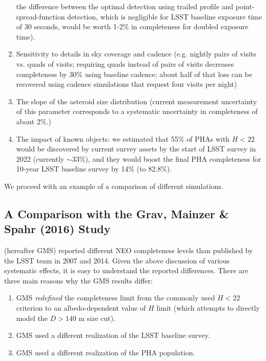 \begin{enumerate}
          the difference between the optimal detection using trailed profile and point-spread-function
          detection, which is negligible for LSST baseline exposure time of 30 seconds, would be worth 1-2\%
          in completeness for doubled exposure time).
\item Sensitivity to details in sky coverage and cadence (e.g. nightly pairs of visits vs. quads of visits;
          requiring quads instead of pairs of visits decreases completeness by 30\% using baseline cadence;
          about half of that loss can be recovered using cadence simulations that request four visits per night)
\item The slope of the asteroid size distribution (current measurement uncertainty of this parameter
          corresponds to a systematic uncertainty in completeness of about 2\%.)
\item The impact of known objects: we estimated that 55\% of PHAs with $H<22$ would be discovered
          by current survey assets by the start of LSST survey in 2022 (currently $\sim$33\%), and they would
          boost the final PHA completeness for 10-year LSST baseline survey by 14\% (to 82.8\%).
\end{enumerate}

We proceed with an example of a comparison of different simulations.

\subsection{A Comparison with the Grav, Mainzer \& Spahr (2016) Study \label{sec:GMS}}

\cite{GMS2016} (hereafter GMS)   %
reported different NEO completeness levels than published by the LSST team
in 2007 and 2014. Given the above discussion of various systematic effects, it is easy to understand
the reported differences. There are three main reasons why the GMS results differ:
\begin{enumerate}
\item GMS {\it redefined} the completeness limit from the commonly
  used $H<22$ criterion to an albedo-dependent value of $H$ limit (which
  attempts to directly model the $D>140$ m size cut).
\item GMS used a different realization of the LSST baseline survey.
\item GMS used a different realization of the PHA population.
\end{enumerate}

